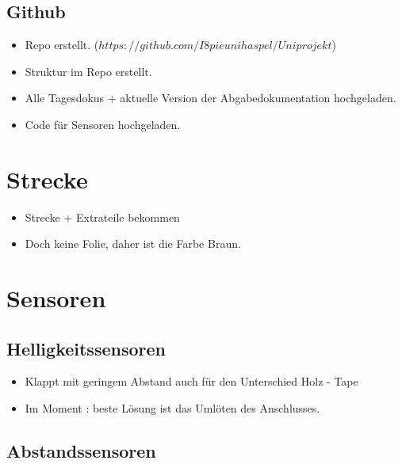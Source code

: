 \documentclass{article}
\begin{document}
\subsection{Github}

\begin{itemize}

\item Repo erstellt. ($https://github.com/I8pieunihaspel/Uniprojekt$)

\item Struktur im Repo erstellt.

\item Alle Tagesdokus + aktuelle Version der Abgabedokumentation hochgeladen.

\item Code für Sensoren hochgeladen.

\end{itemize}

\section{Strecke}

\begin{itemize}

\item Strecke  + Extrateile bekommen

\item Doch keine Folie, daher ist die Farbe Braun.

\end{itemize}

\section{Sensoren}

\subsection{Helligkeitssensoren}

\begin{itemize}

\item Klappt mit geringem Abstand auch für den Unterschied Holz - Tape

\item Im Moment : beste Lösung ist das Umlöten des Anschlusses.

\end{itemize}

\subsection{Abstandssensoren}
\end{document}
